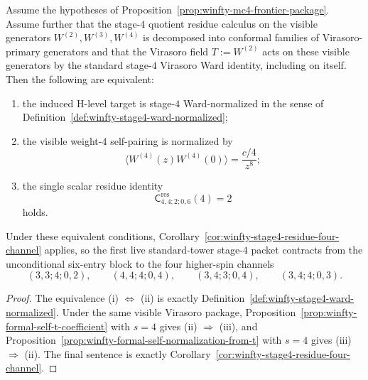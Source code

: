 \begin{corollary}
\label{cor:winfty-stage4-single-scalar-equivalent}
Assume the hypotheses of
Proposition~\ref{prop:winfty-mc4-frontier-package}. Assume further
that the stage-$4$ quotient residue calculus on the visible generators
$W^{(2)},W^{(3)},W^{(4)}$ is decomposed into conformal families of
Virasoro-primary generators and that the Virasoro field $T:=W^{(2)}$
acts on these visible generators by the standard stage-$4$ Virasoro
Ward identity, including on itself. Then the following are
equivalent:
\begin{enumerate}[label=\textup{(\roman*)}]
\item the induced H-level target is stage-$4$ Ward-normalized in the
 sense of Definition~\ref{def:winfty-stage4-ward-normalized};
\item the visible weight-$4$ self-pairing is normalized by
 \[
 \langle W^{(4)}(z)W^{(4)}(0)\rangle = \frac{c/4}{z^{8}};
 \]
\item the single scalar residue identity
 \[
 \mathsf{C}^{\mathrm{res}}_{4,4;2;0,6}(4)=2
 \]
 holds.
\end{enumerate}
Under these equivalent conditions,
Corollary~\ref{cor:winfty-stage4-residue-four-channel} applies, so the
first live standard-tower stage-$4$ packet contracts from the
unconditional six-entry block to the four higher-spin channels
\[
(3,3;4;0,2),\qquad
(4,4;4;0,4),\qquad
(3,4;3;0,4),\qquad
(3,4;4;0,3).
\]
\end{corollary}

\begin{proof}
The equivalence \textup{(i)} \(\Longleftrightarrow\) \textup{(ii)} is
exactly Definition~\ref{def:winfty-stage4-ward-normalized}. Under the
same visible Virasoro package,
Proposition~\ref{prop:winfty-formal-self-t-coefficient} with $s=4$
gives \textup{(ii)} \(\Longrightarrow\) \textup{(iii)}, and
Proposition~\ref{prop:winfty-formal-self-normalization-from-t} with
$s=4$ gives \textup{(iii)} \(\Longrightarrow\) \textup{(ii)}.
The final sentence is exactly
Corollary~\ref{cor:winfty-stage4-residue-four-channel}.
\end{proof}

